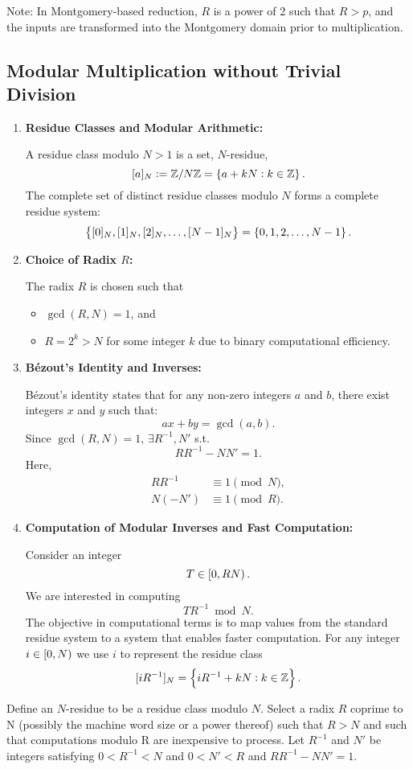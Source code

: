 Note: In Montgomery-based reduction, $R$ is a power of 2 such that $R > p$, and the inputs are transformed into the Montgomery domain prior to multiplication.
\fi

\subsection{Modular Multiplication without Trivial Division}
\begin{enumerate}[\bf 1.]
	\item \textbf{Residue Classes and Modular Arithmetic:}
	
	A residue class modulo $N>1$ is a set, $N$-residue, \[
	[a]_N:=\mathbb{Z}/N\mathbb{Z}=\set{a + kN: k\in\mathbb{Z}}.
	\]
	The complete set of distinct residue classes modulo $N$ forms a complete residue system: \[
	\set{[0]_N,[1]_N,[2]_N,\dots, [N-1]_N}=\set{0,1,2,\dots, N-1}.
	\]
	\item \textbf{Choice of Radix $R$:}
	
	The radix $R$ is chosen such that 
	\begin{itemize}
		\item $\gcd(R,N)=1$, and
		\item $R=2^k>N$ for some integer $k$ due to binary computational efficiency. 
	\end{itemize}
	\item \textbf{Bézout's Identity and Inverses:}
	
	Bézout's identity states that for any non-zero integers $a$ and $b$, there exist integers $x$ and $y$ such that: \[
	ax+by=\gcd(a,b).
	\] Since $\gcd(R,N)=1$, $\exists R^{-1}, N'$ s.t. \[
	RR^{-1}-NN'=1.
	\] Here, \begin{align*}
		RR^{-1}&\equiv 1\pmod{N},\\
		N(-N')&\equiv 1\pmod{R}.
	\end{align*}
	\item \textbf{Computation of Modular Inverses and Fast Computation:}
	
	Consider an integer \[
	T\in\intco{0,RN}.
	\] We are interested in computing \[
	TR^{-1}\bmod{N}.
	\] The objective in computational terms is to map values from the standard residue system to a system that enables faster computation. For any integer $i\in\intco{0,N}$ we use $i$ to represent the residue class 
	\[
	[iR^{-1}]_N=\set{iR^{-1}+kN:k\in\mathbb{Z}}.
	\]
\end{enumerate}

Define an $N$-residue to be a residue class modulo $N$. Select a radix $R$
coprime to N (possibly the machine word size or a power thereof) such that $R > N$
and such that computations modulo R are inexpensive to process. Let $R^{-1}$ and $N'$ be
integers satisfying $0 < R^{-1} < N$ and $0 < N' < R$ and $RR^{-1} - NN' = 1$.


